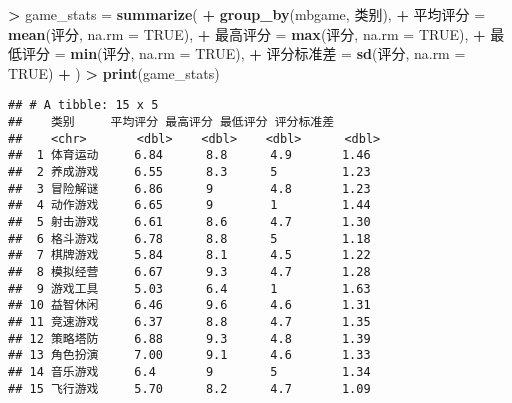 \documentclass[
]{article}
\newenvironment{Shaded}{\begin{snugshade}}{\end{snugshade}}
\newcommand{\AttributeTok}[1]{\textcolor[rgb]{0.13,0.29,0.53}{#1}}
\newcommand{\ConstantTok}[1]{\textcolor[rgb]{0.56,0.35,0.01}{#1}}
\newcommand{\FunctionTok}[1]{\textcolor[rgb]{0.13,0.29,0.53}{\textbf{#1}}}
\newcommand{\NormalTok}[1]{#1}
\newcommand{\OtherTok}[1]{\textcolor[rgb]{0.56,0.35,0.01}{#1}}
\newcommand{\SpecialCharTok}[1]{\textcolor[rgb]{0.81,0.36,0.00}{\textbf{#1}}}
\begin{document}
\begin{Shaded}
\begin{Highlighting}[]
\SpecialCharTok{\textgreater{}}\NormalTok{ game\_stats }\OtherTok{=} \FunctionTok{summarize}\NormalTok{(}
\SpecialCharTok{+}   \FunctionTok{group\_by}\NormalTok{(mbgame, 类别),}
\SpecialCharTok{+}\NormalTok{   平均评分 }\OtherTok{=} \FunctionTok{mean}\NormalTok{(评分, }\AttributeTok{na.rm =} \ConstantTok{TRUE}\NormalTok{),}
\SpecialCharTok{+}\NormalTok{   最高评分 }\OtherTok{=} \FunctionTok{max}\NormalTok{(评分, }\AttributeTok{na.rm =} \ConstantTok{TRUE}\NormalTok{),}
\SpecialCharTok{+}\NormalTok{   最低评分 }\OtherTok{=} \FunctionTok{min}\NormalTok{(评分, }\AttributeTok{na.rm =} \ConstantTok{TRUE}\NormalTok{),}
\SpecialCharTok{+}\NormalTok{   评分标准差 }\OtherTok{=} \FunctionTok{sd}\NormalTok{(评分, }\AttributeTok{na.rm =} \ConstantTok{TRUE}\NormalTok{)}
\SpecialCharTok{+}\NormalTok{ )}
\SpecialCharTok{\textgreater{}} \FunctionTok{print}\NormalTok{(game\_stats)}
\end{Highlighting}
\end{Shaded}

\begin{verbatim}
## # A tibble: 15 x 5
##    类别     平均评分 最高评分 最低评分 评分标准差
##    <chr>       <dbl>    <dbl>    <dbl>      <dbl>
##  1 体育运动     6.84      8.8      4.9       1.46
##  2 养成游戏     6.55      8.3      5         1.23
##  3 冒险解谜     6.86      9        4.8       1.23
##  4 动作游戏     6.65      9        1         1.44
##  5 射击游戏     6.61      8.6      4.7       1.30
##  6 格斗游戏     6.78      8.8      5         1.18
##  7 棋牌游戏     5.84      8.1      4.5       1.22
##  8 模拟经营     6.67      9.3      4.7       1.28
##  9 游戏工具     5.03      6.4      1         1.63
## 10 益智休闲     6.46      9.6      4.6       1.31
## 11 竞速游戏     6.37      8.8      4.7       1.35
## 12 策略塔防     6.88      9.3      4.8       1.39
## 13 角色扮演     7.00      9.1      4.6       1.33
## 14 音乐游戏     6.4       9        5         1.34
## 15 飞行游戏     5.70      8.2      4.7       1.09
\end{verbatim}
\end{document}
